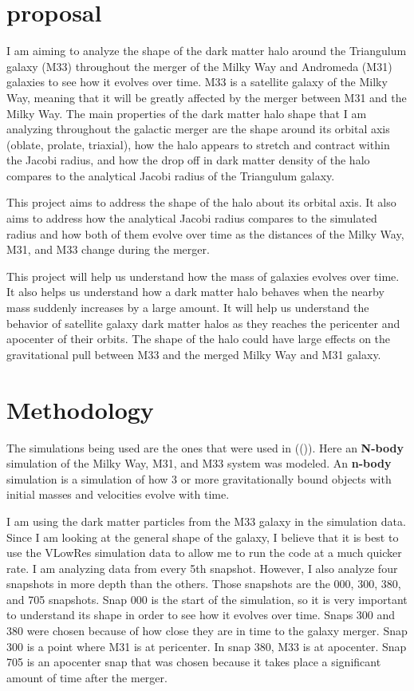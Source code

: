 \documentclass[fleqn,usenatbib]{mnras}
\begin{document}
\section {proposal}
        I am aiming to analyze the shape of the dark matter halo around the Triangulum galaxy (M33) throughout the merger of the Milky Way and Andromeda (M31) galaxies to see how it evolves over time. M33 is a satellite galaxy of the Milky Way, meaning that it will be greatly affected by the merger between M31 and the Milky Way. The main properties of the dark matter halo shape that I am analyzing throughout the galactic merger are the shape around its orbital axis (oblate, prolate, triaxial), how the halo appears to stretch and contract within the Jacobi radius, and how the drop off in dark matter density of the halo compares to the analytical Jacobi radius of the Triangulum galaxy.

        This project aims to address the shape of the halo about its orbital axis. It also aims to address how the analytical Jacobi radius compares to the simulated radius and how both of them evolve over time as the distances of the Milky Way, M31, and M33 change during the merger.


        This project will help us understand how the mass of galaxies evolves over time. It also helps us understand how a dark matter halo behaves when the nearby mass suddenly increases by a large amount. It will help us understand the behavior of satellite galaxy dark matter halos as they reaches the pericenter and apocenter of their orbits. The shape of the halo could have large effects on the gravitational pull between M33 and the merged Milky Way and M31 galaxy.



\section{Methodology}
        The simulations being used are the ones that were used in ((\citet{vanderMarel2012})). Here an \textbf{N-body} simulation of the Milky Way, M31, and M33 system was modeled. An \textbf{n-body} simulation is a simulation of how 3 or more gravitationally bound objects with initial masses and velocities evolve with time.

        I am using the dark matter particles from the M33 galaxy in the simulation data. Since I am looking at the general shape of the galaxy, I believe that it is best to use the VLowRes simulation data to allow me to run the code at a much quicker rate. I am analyzing data from every 5th snapshot. However, I also analyze four snapshots in more depth than the others. Those snapshots are the 000, 300, 380, and 705 snapshots. Snap 000 is the start of the simulation, so it is very important to understand its shape in order to see how it evolves over time. Snaps 300 and 380 were chosen because of how close they are in time to the galaxy merger. Snap 300 is a point where M31 is at pericenter. In snap 380, M33 is at apocenter. Snap 705 is an apocenter snap that was chosen because it takes place a significant amount of time after the merger.
\end{document}
